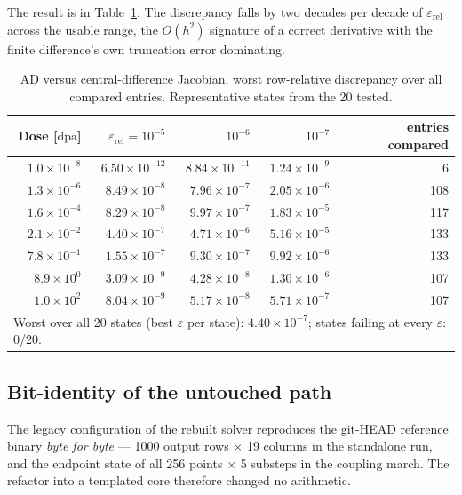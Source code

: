 \documentclass[11pt,a4paper]{article}
\newcommand{\dpa}{\ensuremath{\mathrm{dpa}}}
\begin{document}
The result is in Table~\ref{tab:jac}. The discrepancy falls by two decades per
decade of $\varepsilon_{\mathrm{rel}}$ across the usable range, the $O(h^2)$
signature of a correct derivative with the finite difference's own truncation
error dominating.

\begin{table}[htb]
\centering
\caption{AD versus central-difference Jacobian, worst row-relative discrepancy
over all compared entries. Representative states from the 20 tested.}
\label{tab:jac}
\begin{tabular}{rrrrr}
\toprule
Dose [\dpa] & $\varepsilon_{\mathrm{rel}}=10^{-5}$ & $10^{-6}$ & $10^{-7}$
            & entries compared \\
\midrule
$1.0\times10^{-8}$ & $6.50\times10^{-12}$ & $8.84\times10^{-11}$ & $1.24\times10^{-9}$ & 6 \\
$1.3\times10^{-6}$ & $8.49\times10^{-8}$  & $7.96\times10^{-7}$  & $2.05\times10^{-6}$ & 108 \\
$1.6\times10^{-4}$ & $8.29\times10^{-8}$  & $9.97\times10^{-7}$  & $1.83\times10^{-5}$ & 117 \\
$2.1\times10^{-2}$ & $4.40\times10^{-7}$  & $4.71\times10^{-6}$  & $5.16\times10^{-5}$ & 133 \\
$7.8\times10^{-1}$ & $1.55\times10^{-7}$  & $9.30\times10^{-7}$  & $9.92\times10^{-6}$ & 133 \\
$8.9\times10^{0}$  & $3.09\times10^{-9}$  & $4.28\times10^{-8}$  & $1.30\times10^{-6}$ & 107 \\
$1.0\times10^{2}$  & $8.04\times10^{-9}$  & $5.17\times10^{-8}$  & $5.71\times10^{-7}$ & 107 \\
\midrule
\multicolumn{5}{l}{Worst over all 20 states (best $\varepsilon$ per state):
 $4.40\times10^{-7}$; states failing at every $\varepsilon$: 0/20.} \\
\bottomrule
\end{tabular}
\end{table}

\subsection{Bit-identity of the untouched path}

The legacy configuration of the rebuilt solver reproduces the git-HEAD
reference binary \emph{byte for byte} --- 1000 output rows $\times$ 19 columns
in the standalone run, and the endpoint state of all 256 points $\times$ 5
substeps in the coupling march. The refactor into a templated core therefore
changed no arithmetic.
\end{document}
